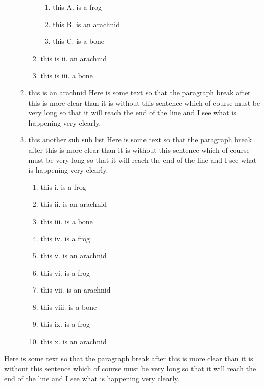 \documentclass{article}
\begin{document}
\begin{enumerate}
\begin{enumerate}
\begin{enumerate}
          \begin{enumerate}
          \item this A. is a frog
          \item this B. is an arachnid
          \item this C. is a bone
          \end{enumerate}
      \item this is ii. an arachnid
      \item this is iii. a bone
      \end{enumerate}
   \item this is an arachnid Here is some text so that the paragraph break after this
is more clear than it is without this sentence which of
course must be very long so that it will reach the end of
the line and I see what is happening very clearly.

   \item this another sub sub list Here is some text so that the paragraph break after this
is more clear than it is without this sentence which of
course must be very long so that it will reach the end of
the line and I see what is happening very clearly.

      \begin{enumerate}
      \item this i. is a frog
      \item this ii. is an arachnid
      \item this iii. is a bone
      \item this iv. is a frog
      \item this v. is an arachnid
      \item this vi. is a frog
      \item this vii. is an arachnid
      \item this viii. is a bone
      \item this ix. is a frog
      \item this x. is an arachnid
      \end{enumerate}
   \end{enumerate}
\end{enumerate}
Here is some text so that the paragraph break after this
is more clear than it is without this sentence which of
course must be very long so that it will reach the end of
the line and I see what is happening very clearly.
\end{document}
